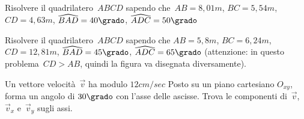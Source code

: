 
\begin{multicols}{2}
 \begin{esercizio}
\label{ese:G.34}
Risolvere il quadrilatero~\(ABCD\) sapendo che~\({AB}=8,01\unit{m}\),
\({BC}=5,54\unit{m}\), \({CD}=4,63\unit{m}\), \(\widehat{BAD}=40\grado\), 
\(\widehat{ADC}=50\grado\)
\end{esercizio}

\begin{esercizio}
\label{ese:G.35}
Risolvere il quadrilatero~\(ABCD\) sapendo che  \({AB}=5,8\unit{m}\), 
\({BC}=6,24\unit{m}\),
\({CD}=12,81\unit{m}\), \(\widehat{BAD}=45\grado\), \(\widehat{ADC}=65\grado\)
(attenzione: in questo problema~\({CD}>{AB}\), quindi la figura va disegnata 
diversamente).
\end{esercizio}

% 
%  
\begin{esercizio}
\label{ese:G.37}
Un vettore velocità~\(\vec{v}\) ha modulo \(12\unit{cm/sec}\) Posto su un piano 
cartesiano \(O_{xy}\), forma un angolo di \(30\grado\) con
l'asse delle ascisse. Trova le componenti di~\(\vec{v}\), \(\vec{v}_x\) 
e~\(\vec{v}_y\) sugli assi.
\end{esercizio}


\end{multicols}
